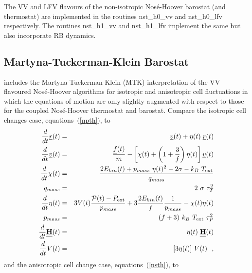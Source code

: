 The VV and LFV flavours of the non-isotropic Nos\'e-Hoover
barostat (and thermostat) are implemented in the \D routines
{\sc nst\_h0\_vv} and {\sc nst\_h0\_lfv} respectively.
The routines {\sc nst\_h1\_vv} and {\sc nst\_h1\_lfv} implement the
same but also incorporate RB dynamics.

\subsection{Martyna-Tuckerman-Klein Barostat}

\D includes the Martyna-Tuckerman-Klein (MTK) interpretation of the
VV flavoured Nos\'{e}-Hoover algorithms \cite{martyna-96a} for isotropic
and anisotropic cell fluctuations in which the equations of motion are
only slightly augmented with respect to those for the coupled
Nos\'e-Hoover thermostat and
barostat.  Compare the isotropic cell
changes case, equations~(\ref{npth}), to
\begin{eqnarray}
\frac{d}{dt} \mbox{$\underline{r}$}(t) &=& \mbox{$\underline{v}$}(t) + \eta (t) \; \mbox{$\underline{r}$}(t) \nonumber \\
\frac{d}{dt} \mbox{$\underline{v}$}(t) &=& \frac{\mbox{$\underline{f}$}(t)}{m} - \left[ \chi(t) +
\left(1+\frac{3}{f}\right) \eta (t) \right] \mbox{$\underline{v}$}(t) \nonumber \\
\frac{d}{dt} \chi(t) &=& \frac{2 E_{kin}(t) + p_{mass}~\eta (t)^{2} -
2 \sigma - k_{B}~T_{\rm ext}}{q_{mass}} \nonumber \\
q_{mass} &=& 2~\sigma~\tau_{T}^{2} \\
\frac{d}{dt}\eta (t) &=& 3 V(t) \frac{{\cal P}(t) - P_{\rm ext}}{p_{mass}} +
3 \frac{2 E_{kin}(t)}{f} \frac{1}{p_{mass}} - \chi(t) \eta (t) \nonumber \\
p_{mass} &=& (f+3)~k_{B}~T_{\rm ext}~\tau_{P}^{2} \nonumber \\
\frac{d}{dt}\mbox{$\underline{\underline{\bf H}}$}(t) &=& \eta (t) \; \mbox{$\underline{\underline{\bf H}}$}(t) \nonumber \\
\frac{d}{dt} V(t) &=& [3 \eta (t)]~V(t)~~, \nonumber
\end{eqnarray}
and the anisotropic cell change case, equations~(\ref{nsth}), to
